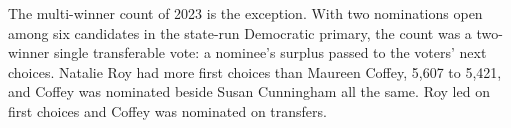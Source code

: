 The multi-winner count of 2023 is the exception. With two nominations open among
six candidates in the state-run Democratic primary, the count was a two-winner
single transferable vote: a nominee's surplus passed to the voters' next choices.
Natalie Roy had more first choices than Maureen Coffey, 5,607 to 5,421, and Coffey
was nominated beside Susan Cunningham all the
same.\autocite[contest 160326]{vaelections}\fnsep\autocite{arlnow2023coffeyprimary}
Roy led on first choices and Coffey was nominated on transfers.


